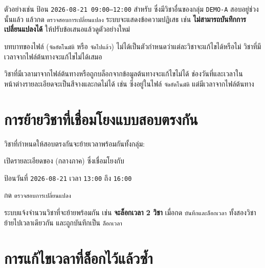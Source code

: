 ตัวอย่างเช่น ป้อน \texttt{2026-08-21 09:00--12:00} สำหรับ 
ซึ่งมีวิชาอื่นของกลุ่ม \texttt{DEMO-A} สอบอยู่ช่วงนั้นแล้ว แล้วกด
\texttt{ตรวจสอบการเปลี่ยนแปลง} ระบบจะแสดงข้อความปฏิเสธ เช่น
\textbf{ไม่สามารถบันทึกการเปลี่ยนแปลงได้} ให้ปรับข้อเสนอแล้วดูตัวอย่างใหม่


\begin{caution}
บทบาทของไฟล์ (\texttt{จัดอัตโนมัติ} หรือ \texttt{จัดไปแล้ว})
ไม่ได้เป็นตัวกำหนดว่าแต่ละวิชาจะแก้ไขได้หรือไม่
วิชาที่มีเวลาจากไฟล์ต้นทางจะแก้ไขไม่ได้เสมอ
\end{caution}

วิชาที่มีเวลามาจากไฟล์ต้นทางหรือถูกบล็อกจากข้อมูลต้นทางจะแก้ไขไม่ได้
ช่องวันที่และเวลาในหน้าต่างรายละเอียดจะเป็นสีจางและกดไม่ได้ เช่น
 ซึ่งอยู่ในไฟล์ \texttt{จัดอัตโนมัติ} แต่มีเวลาจากไฟล์ต้นทาง


\section{การย้ายวิชาที่เชื่อมโยงแบบสอบตรงกัน}

วิชาที่กำหนดให้สอบตรงกันจะย้ายเวลาพร้อมกันทั้งกลุ่ม:

\begin{steps}
  \item เปิดรายละเอียดของ  (กลางภาค)
        ซึ่งเชื่อมโยงกับ 
  \item ป้อนวันที่ \texttt{2026-08-21} เวลา \texttt{13:00} ถึง \texttt{16:00}
  \item กด \texttt{ตรวจสอบการเปลี่ยนแปลง}
\end{steps}

\begin{expected}
ระบบแจ้งจำนวนวิชาที่จะย้ายพร้อมกัน เช่น \textbf{จะล็อกเวลา 2 วิชา}
เมื่อกด \texttt{บันทึกและล็อกเวลา} ทั้งสองวิชาย้ายไปเวลาเดียวกัน
และถูกบันทึกเป็น \texttt{ล็อกเวลา}
\end{expected}


\section{การแก้ไขเวลาที่ล็อกไว้แล้วซ้ำ}

